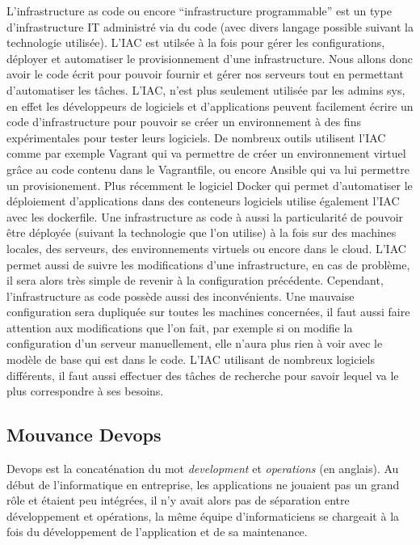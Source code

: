 \documentclass[]{article}
\begin{document}
L'infrastructure as code ou encore ``infrastructure programmable'' est
un type d'infrastructure IT administré via du code (avec divers langage
possible suivant la technologie utilisée). L'IAC est utilsée à la fois
pour gérer les configurations, déployer et automatiser le
provisionnement d'une infrastructure. Nous allons donc avoir le code
écrit pour pouvoir fournir et gérer nos serveurs tout en permettant
d'automatiser les tâches. L'IAC, n'est plus seulement utilisée par les
admins sys, en effet les développeurs de logiciels et d'applications
peuvent facilement écrire un code d'infrastructure pour pouvoir se créer
un environnement à des fins expérimentales pour tester leurs logiciels.
De nombreux outils utilisent l'IAC comme par exemple Vagrant qui va
permettre de créer un environnement virtuel grâce au code contenu dans
le Vagrantfile, ou encore Ansible qui va lui permettre un
provisionement. Plus récemment le logiciel Docker qui permet
d'automatiser le déploiement d'applications dans des conteneurs
logiciels utilise également l'IAC avec les dockerfile. Une
infrastructure as code à aussi la particularité de pouvoir être déployée
(suivant la technologie que l'on utilise) à la fois sur des machines
locales, des serveurs, des environnements virtuels ou encore dans le
cloud. L'IAC permet aussi de suivre les modifications d'une
infrastructure, en cas de problème, il sera alors très simple de revenir
à la configuration précédente. Cependant, l'infrastructure as code
possède aussi des inconvénients. Une mauvaise configuration sera
dupliquée sur toutes les machines concernées, il faut aussi faire
attention aux modifications que l'on fait, par exemple si on modifie la
configuration d'un serveur manuellement, elle n'aura plus rien à voir
avec le modèle de base qui est dans le code. L'IAC utilisant de nombreux
logiciels différents, il faut aussi effectuer des tâches de recherche
pour savoir lequel va le plus correspondre à ses besoins.

\subsection{Mouvance Devops}\label{mouvance-devops}

Devops est la concaténation du mot \emph{development} et
\emph{operations} (en anglais). Au début de l'informatique en
entreprise, les applications ne jouaient pas un grand rôle et étaient
peu intégrées, il n'y avait alors pas de séparation entre développement
et opérations, la même équipe d'informaticiens se chargeait à la fois du
développement de l'application et de sa maintenance.
\end{document}

